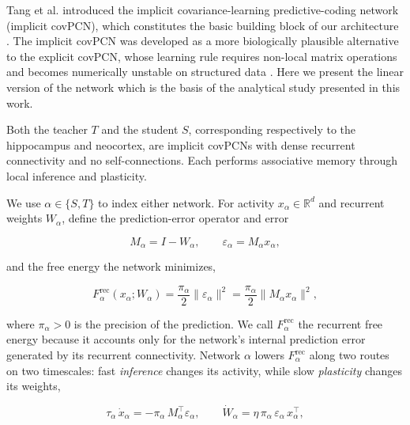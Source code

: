 \documentclass[10pt,letterpaper]{article}
\theoremstyle{plain}
\theoremstyle{remark}
\begin{document}
Tang et al. introduced the implicit covariance-learning predictive-coding network (implicit covPCN), which constitutes the basic building block of our architecture \cite{tang2023covpcn}. The implicit covPCN was developed as a more biologically plausible alternative to the explicit covPCN, whose learning rule requires non-local matrix operations and becomes numerically unstable on structured data \cite{friston2003learning,friston2005theory,bogacz2017tutorial,tang2023covpcn}. Here we present the linear version of the network which is the basis of the analytical study presented in this work.

Both the teacher $T$ and the student $S$, corresponding respectively to the hippocampus and neocortex, are implicit covPCNs with dense recurrent connectivity and no self-connections. Each performs associative memory through local inference and plasticity.
\par\vspace{\baselineskip}\noindent
We use $\alpha\in\{S,T\}$ to index either network. For activity $x_\alpha\in\mathbb R^d$ and recurrent weights $W_\alpha$, define the prediction-error operator and error

\begin{equation}
M_\alpha=I-W_\alpha,
\qquad
\varepsilon_\alpha=M_\alpha x_\alpha,
\label{eq:single-error}
\end{equation}

and the free energy the network minimizes,

\begin{equation}
F_\alpha^{\mathrm{rec}}(x_\alpha;W_\alpha)=\frac{\pi_\alpha}{2}\|\varepsilon_\alpha\|^2
=\frac{\pi_\alpha}{2}\|M_\alpha x_\alpha\|^2,
\label{eq:single-energy}
\end{equation}

where $\pi_\alpha>0$ is the precision of the prediction. We call $F_\alpha^{\mathrm{rec}}$ the recurrent free energy because it accounts only for the network's internal prediction error generated by its recurrent connectivity. Network $\alpha$ lowers $F_\alpha^{\mathrm{rec}}$ along two routes on two timescales: fast \emph{inference} changes its activity, while slow \emph{plasticity} changes its weights,

\begin{equation}
\tau_\alpha\,\dot x_\alpha=-\pi_\alpha\,M_\alpha^\top\varepsilon_\alpha,
\qquad
\dot W_\alpha=\eta\,\pi_\alpha\,\varepsilon_\alpha\,x_\alpha^\top,
\label{eq:single-dynamics}
\end{equation}
\end{document}
